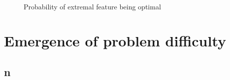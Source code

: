 \begin{figure}
\centering
{}
\caption{Probability of extremal feature being optimal}
\label{fig:diff:opt:minmax}
\end{figure}
\begin{figure}[p]\centering
\ContinuedFloat
{}
\end{figure}
\begin{figure}[p]\centering
\ContinuedFloat
{}
\end{figure}

\section{Emergence of problem difficulty}\label{sec:diff:stepwise}
\subsection{\Jrnd}\label{sec:easyhard:jrnd}
\subsection{\Jrndn}\label{sec:easyhard:jrndn}
\subsection{}\label{sec:easyhard:frnd}
\subsection{n}\label{sec:easyhard:frndn}
\subsection{\Fjc}\label{sec:easyhard:fjc}
\subsection{\Fmc}\label{sec:easyhard:fmc}
\subsection{\Fmxc}\label{sec:easyhard:fmxc}

